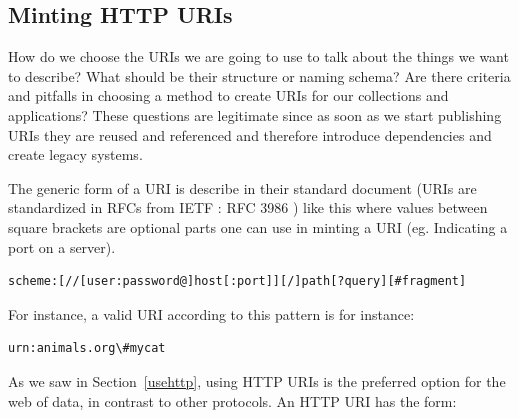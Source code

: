 




\hypertarget{minting-http-uris}{%
\subsection{Minting HTTP URIs}\label{minting-http-uris}}

How do we choose the URIs we are going to use to talk about the things
we want to describe? What should be their structure or naming schema?
Are there criteria and pitfalls in choosing a method to create URIs for
our collections and applications? These questions are legitimate since
as soon as we start publishing URIs they are reused and referenced and
therefore introduce dependencies and create legacy systems.

The generic form of a URI is describe in their standard
document (URIs are standardized in RFCs from IETF : RFC 3986
  \cite{masinter2005uniform}) like this where values between
square brackets are optional parts one can use in minting a URI (eg.
Indicating a port on a server).

\begin{lstlisting}
scheme:[//[user:password@]host[:port]][/]path[?query][#fragment]
\end{lstlisting}

For instance, a valid URI according to this pattern is for instance:

\begin{lstlisting}
urn:animals.org\#mycat
\end{lstlisting}

As we saw in Section~\ref{usehttp}, using HTTP URIs is the preferred option for the web 
of data, in contrast to other protocols.  An HTTP URI has the form: 


